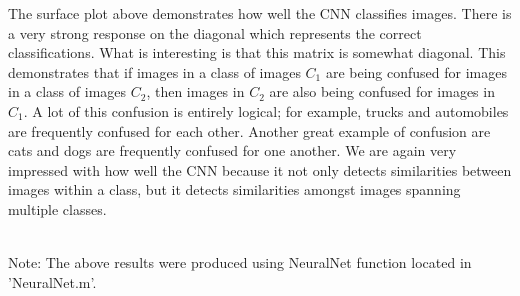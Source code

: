 \documentclass[11pt,english]{article}
\begin{document}
	
   The surface plot above demonstrates how well the CNN classifies images. There is a very strong response on the diagonal which represents the correct classifications. What is interesting is that this matrix is somewhat diagonal. This demonstrates that if images in a class of images $C_1$ are being confused for images in a class of images $C_2$, then images in $C_2$ are also being confused for images in $C_1$. A lot of this confusion is entirely logical; for example, trucks and automobiles are frequently confused for each other. Another great example of confusion are cats and dogs are frequently confused for one another. We are again very impressed with how well the CNN because it not only detects similarities between images within a class, but it detects similarities amongst images spanning multiple classes.
       
    ~\\
    \noindent
    Note: The above results were produced using NeuralNet function located in 'NeuralNet.m'.
\end{document}

